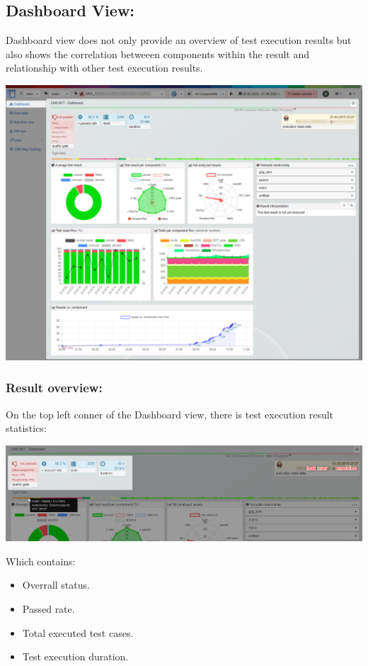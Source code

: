 \hypertarget{dashboard-view}{%
\subsection{Dashboard View:}\label{dashboard-view}}
Dashboard view does not only provide an overview of test execution results but 
also shows the correlation betweeen components within the result 
and relationship with other test execution results.

\includegraphics[width=1\linewidth]{./pictures/view_dashboard.png}

\subsubsection{Result overview:}
On the top left conner of the Dashboard view, there is test execution result 
statistics:

\includegraphics[width=1\linewidth]{./pictures/dashboard/result_statistics.png}

Which contains:
\begin{itemize}
   \item Overrall status.
   \item Passed rate.
   \item Total executed test cases.
   \item Test execution duration.
\end{itemize}


